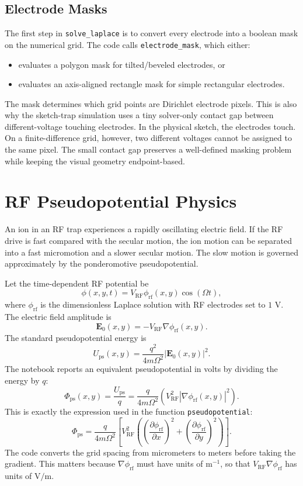 \documentclass[11pt]{article}
\begin{document}
\subsection{Electrode Masks}

The first step in \texttt{solve\_laplace} is to convert every electrode into a
boolean mask on the numerical grid. The code calls
\texttt{electrode\_mask}, which either:
\begin{itemize}
  \item evaluates a polygon mask for tilted/beveled electrodes, or
  \item evaluates an axis-aligned rectangle mask for simple rectangular
        electrodes.
\end{itemize}
The mask determines which grid points are Dirichlet electrode pixels. This is
also why the sketch-trap simulation uses a tiny solver-only contact gap between
different-voltage touching electrodes. In the physical sketch, the electrodes
touch. On a finite-difference grid, however, two different voltages cannot be
assigned to the same pixel. The small contact gap preserves a well-defined
masking problem while keeping the visual geometry endpoint-based.

\newpage

\section{RF Pseudopotential Physics}

An ion in an RF trap experiences a rapidly oscillating electric field. If the
RF drive is fast compared with the secular motion, the ion motion can be
separated into a fast micromotion and a slower secular motion. The slow motion
is governed approximately by the ponderomotive pseudopotential.

Let the time-dependent RF potential be
\[
  \phi(x,y,t) = V_{\mathrm{RF}}\phi_{\mathrm{rf}}(x,y)\cos(\Omega t),
\]
where \(\phi_{\mathrm{rf}}\) is the dimensionless Laplace solution with RF
electrodes set to \(1\) V. The electric field amplitude is
\[
  \mathbf{E}_{0}(x,y)
  =
  -V_{\mathrm{RF}}\nabla\phi_{\mathrm{rf}}(x,y).
\]
The standard pseudopotential energy is
\[
  U_{\mathrm{ps}}(x,y)
  =
  \frac{q^2}{4m\Omega^2}
  |\mathbf{E}_{0}(x,y)|^2.
\]
The notebook reports an equivalent pseudopotential in volts by dividing the
energy by \(q\):
\[
  \Phi_{\mathrm{ps}}(x,y)
  =
  \frac{U_{\mathrm{ps}}}{q}
  =
  \frac{q}{4m\Omega^2}
  \left(V_{\mathrm{RF}}^2|\nabla\phi_{\mathrm{rf}}(x,y)|^2\right).
\]
This is exactly the expression used in the function \texttt{pseudopotential}:
\[
  \Phi_{\mathrm{ps}}
  =
  \frac{q}{4m\Omega^2}
  \left[
    V_{\mathrm{RF}}^2
    \left(
      \left(\frac{\partial\phi_{\mathrm{rf}}}{\partial x}\right)^2
      +
      \left(\frac{\partial\phi_{\mathrm{rf}}}{\partial y}\right)^2
    \right)
  \right].
\]
The code converts the grid spacing from micrometers to meters before taking the
gradient. This matters because \(\nabla\phi_{\mathrm{rf}}\) must have units of
\(\mathrm{m}^{-1}\), so that \(V_{\mathrm{RF}}\nabla\phi_{\mathrm{rf}}\) has
units of \(\mathrm{V/m}\).
\end{document}
